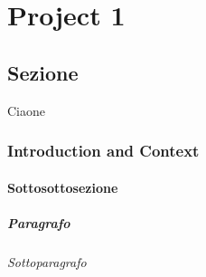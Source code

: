 \chapter{Project 1}
	
\section{Sezione} 

Ciaone

\subsection{Introduction and Context}

\subsubsection{Sottosottosezione}

\paragraph{Paragrafo}

\subparagraph{Sottoparagrafo}


		
	